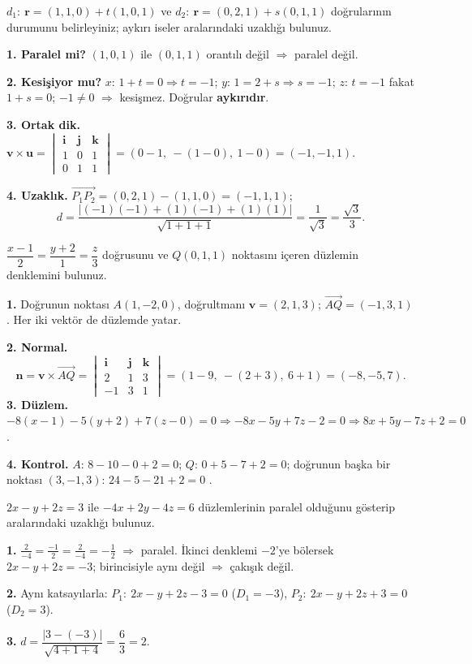 \begin{soru}
$d_1:\ \mathbf r=(1,1,0)+t(1,0,1)$ ve $d_2:\ \mathbf r=(0,2,1)+s(0,1,1)$ doğrularının durumunu belirleyiniz; aykırı iseler aralarındaki uzaklığı bulunuz.
\end{soru}
\begin{cevap}
\textbf{1. Paralel mi?} $(1,0,1)$ ile $(0,1,1)$ orantılı değil $\Rightarrow$ paralel değil.

\textbf{2. Kesişiyor mu?} $x$: $1+t=0\Rightarrow t=-1$; $y$: $1=2+s\Rightarrow s=-1$; $z$: $t=-1$ fakat $1+s=0$; $-1\neq0$ $\Rightarrow$ kesişmez. Doğrular \textbf{aykırıdır}.

\textbf{3. Ortak dik.} $\mathbf v\times\mathbf u=\begin{vmatrix}\mathbf i&\mathbf j&\mathbf k\\1&0&1\\0&1&1\end{vmatrix}=(0-1,\ -(1-0),\ 1-0)=(-1,-1,1)$.

\textbf{4. Uzaklık.} $\overrightarrow{P_1P_2}=(0,2,1)-(1,1,0)=(-1,1,1)$;
\[ d=\frac{|(-1)(-1)+(1)(-1)+(1)(1)|}{\sqrt{1+1+1}}=\frac{1}{\sqrt3}=\frac{\sqrt3}{3}. \]
\end{cevap}

\begin{soru}
$\dfrac{x-1}{2}=\dfrac{y+2}{1}=\dfrac{z}{3}$ doğrusunu ve $Q(0,1,1)$ noktasını içeren düzlemin denklemini bulunuz.
\end{soru}
\begin{cevap}
\textbf{1.} Doğrunun noktası $A(1,-2,0)$, doğrultmanı $\mathbf v=(2,1,3)$; $\overrightarrow{AQ}=(-1,3,1)$. Her iki vektör de düzlemde yatar.

\textbf{2. Normal.}
\[ \mathbf n=\mathbf v\times\overrightarrow{AQ}=\begin{vmatrix}\mathbf i&\mathbf j&\mathbf k\\2&1&3\\-1&3&1\end{vmatrix}=(1-9,\ -(2+3),\ 6+1)=(-8,-5,7). \]
\textbf{3. Düzlem.} $-8(x-1)-5(y+2)+7(z-0)=0\Rightarrow-8x-5y+7z-2=0\Rightarrow\boxed{8x+5y-7z+2=0}$.

\textbf{4. Kontrol.} $A$: $8-10-0+2=0$; $Q$: $0+5-7+2=0$; doğrunun başka bir noktası $(3,-1,3)$: $24-5-21+2=0$ \checkmark.
\end{cevap}

\begin{soru}
$2x-y+2z=3$ ile $-4x+2y-4z=6$ düzlemlerinin paralel olduğunu gösterip aralarındaki uzaklığı bulunuz.
\end{soru}
\begin{cevap}
\textbf{1.} $\frac{2}{-4}=\frac{-1}{2}=\frac{2}{-4}=-\frac12$ $\Rightarrow$ paralel. İkinci denklemi $-2$'ye bölersek $2x-y+2z=-3$; birincisiyle aynı değil $\Rightarrow$ çakışık değil.

\textbf{2.} Aynı katsayılarla: $P_1:\ 2x-y+2z-3=0$ ($D_1=-3$), $P_2:\ 2x-y+2z+3=0$ ($D_2=3$).

\textbf{3.} $d=\dfrac{|3-(-3)|}{\sqrt{4+1+4}}=\dfrac63=\boxed{2}$.
\end{cevap}

